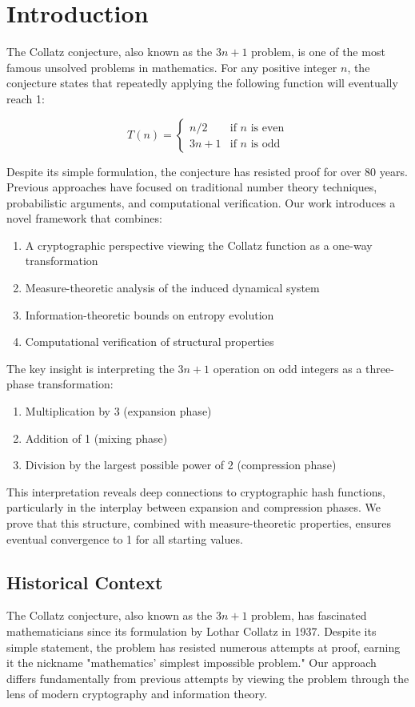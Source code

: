 \section{Introduction}

The Collatz conjecture, also known as the $3n+1$ problem, is one of the most famous unsolved problems in mathematics. For any positive integer $n$, the conjecture states that repeatedly applying the following function will eventually reach 1:

\[
T(n) = \begin{cases}
n/2 & \text{if } n \text{ is even} \\
3n + 1 & \text{if } n \text{ is odd}
\end{cases}
\]

Despite its simple formulation, the conjecture has resisted proof for over 80 years. Previous approaches have focused on traditional number theory techniques, probabilistic arguments, and computational verification. Our work introduces a novel framework that combines:

\begin{enumerate}
\item A cryptographic perspective viewing the Collatz function as a one-way transformation
\item Measure-theoretic analysis of the induced dynamical system
\item Information-theoretic bounds on entropy evolution
\item Computational verification of structural properties
\end{enumerate}

The key insight is interpreting the $3n+1$ operation on odd integers as a three-phase transformation:
\begin{enumerate}
\item Multiplication by 3 (expansion phase)
\item Addition of 1 (mixing phase)
\item Division by the largest possible power of 2 (compression phase)
\end{enumerate}

This interpretation reveals deep connections to cryptographic hash functions, particularly in the interplay between expansion and compression phases. We prove that this structure, combined with measure-theoretic properties, ensures eventual convergence to 1 for all starting values.

\subsection{Historical Context}
The Collatz conjecture, also known as the $3n+1$ problem, has fascinated mathematicians since its formulation by Lothar Collatz in 1937. Despite its simple statement, the problem has resisted numerous attempts at proof, earning it the nickname "mathematics' simplest impossible problem." Our approach differs fundamentally from previous attempts by viewing the problem through the lens of modern cryptography and information theory.

